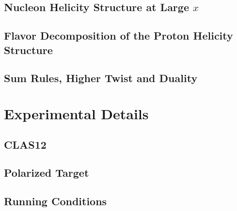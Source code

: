\documentclass[12pt]{article}
\begin{document}
\subsection{Nucleon Helicity Structure at Large $x$}%


\subsection{Flavor Decomposition of the Proton Helicity Structure} %



\subsection{Sum Rules, Higher Twist and Duality} %


\section{Experimental Details}
\subsection{CLAS12}

\subsection{Polarized Target}

\subsection{Running Conditions}
\end{document}

